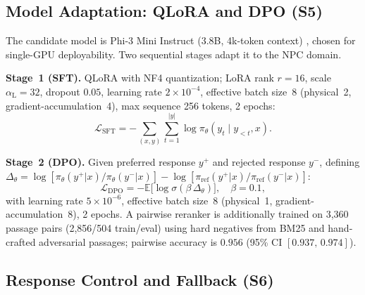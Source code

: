 \documentclass[conference]{IEEEtran}
\begin{document}
\subsection{Model Adaptation: QLoRA and DPO (S5)}

The candidate model is Phi-3 Mini Instruct (3.8B, 4k-token
context) \cite{Abdin2024Phi3}, chosen for single-GPU
deployability. Two sequential stages adapt it to the NPC domain.

\noindent\textbf{Stage~1 (SFT).} QLoRA \cite{Dettmers2023QLoRA}
with NF4 quantization; LoRA rank $r=16$, scale
$\alpha_{\mathrm{L}}=32$, dropout $0.05$, learning rate
$2{\times}10^{-4}$, effective batch size~8 (physical~2,
gradient-accumulation~4), max sequence 256 tokens, 2 epochs:
\begin{equation}
  \mathcal{L}_{\mathrm{SFT}} =
  {-}\!\sum_{(x,y)}\sum_{t=1}^{|y|}
  \log\pi_\theta(y_t\!\mid y_{<t},x).
\end{equation}

\noindent\textbf{Stage~2 (DPO).} Given preferred response $y^+$
and rejected response $y^-$, defining
$\Delta_\theta = \log[\pi_\theta(y^+|x)/\pi_\theta(y^-|x)]
 - \log[\pi_{\mathrm{ref}}(y^+|x)/\pi_{\mathrm{ref}}(y^-|x)]$:
\begin{equation}
  \mathcal{L}_{\mathrm{DPO}} =
  {-}\mathbb{E}\bigl[\log\sigma(\beta\,\Delta_\theta)\bigr],
  \quad\beta=0.1,
  \label{eq:dpo}
\end{equation}
with learning rate $5{\times}10^{-6}$, effective batch
size~8 (physical~1, gradient-accumulation~8), 2 epochs. A
pairwise reranker is additionally trained on 3,360 passage pairs
(2,856/504 train/eval) using hard negatives from BM25 and
hand-crafted adversarial passages; pairwise accuracy is $0.956$
(95\% CI $[0.937,\,0.974]$).

\subsection{Response Control and Fallback (S6)}
\end{document}
